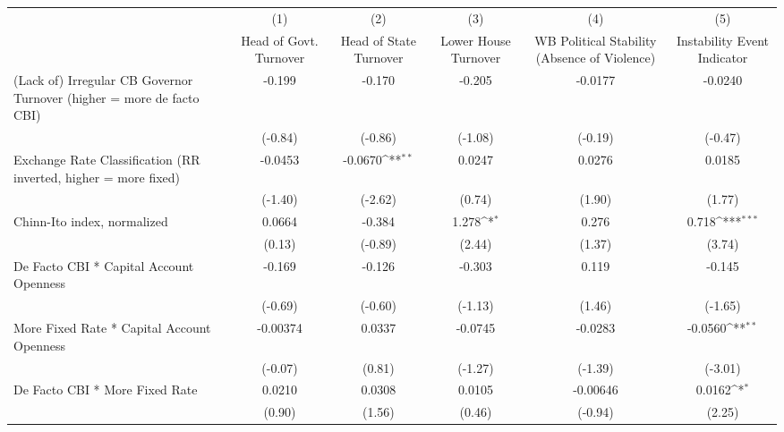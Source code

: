 {
\def\sym#1{\ifmmode^{#1}\else\(^{#1}\)\fi}
\begin{longtable}{l*{5}{c}}
\hline\hline\endfirsthead\hline\endhead\hline\endfoot\endlastfoot
                &\multicolumn{1}{c}{(1)}&\multicolumn{1}{c}{(2)}&\multicolumn{1}{c}{(3)}&\multicolumn{1}{c}{(4)}&\multicolumn{1}{c}{(5)}\\
                &\multicolumn{1}{c}{Head of Govt. Turnover}&\multicolumn{1}{c}{Head of State Turnover}&\multicolumn{1}{c}{Lower House Turnover}&\multicolumn{1}{c}{WB Political Stability (Absence of Violence)}&\multicolumn{1}{c}{Instability Event Indicator}\\
\hline
(Lack of) Irregular CB Governor Turnover (higher = more de facto CBI)&   -0.199         &   -0.170         &   -0.205         &  -0.0177         &  -0.0240         \\
                &  (-0.84)         &  (-0.86)         &  (-1.08)         &  (-0.19)         &  (-0.47)         \\
[1em]
Exchange Rate Classification (RR inverted, higher = more fixed)&  -0.0453         &  -0.0670\sym{**} &   0.0247         &   0.0276         &   0.0185         \\
                &  (-1.40)         &  (-2.62)         &   (0.74)         &   (1.90)         &   (1.77)         \\
[1em]
Chinn-Ito index, normalized&   0.0664         &   -0.384         &    1.278\sym{*}  &    0.276         &    0.718\sym{***}\\
                &   (0.13)         &  (-0.89)         &   (2.44)         &   (1.37)         &   (3.74)         \\
[1em]
De Facto CBI * Capital Account Openness&   -0.169         &   -0.126         &   -0.303         &    0.119         &   -0.145         \\
                &  (-0.69)         &  (-0.60)         &  (-1.13)         &   (1.46)         &  (-1.65)         \\
[1em]
More Fixed Rate * Capital Account Openness& -0.00374         &   0.0337         &  -0.0745         &  -0.0283         &  -0.0560\sym{**} \\
                &  (-0.07)         &   (0.81)         &  (-1.27)         &  (-1.39)         &  (-3.01)         \\
[1em]
De Facto CBI * More Fixed Rate&   0.0210         &   0.0308         &   0.0105         & -0.00646         &   0.0162\sym{*}  \\
                &   (0.90)         &   (1.56)         &   (0.46)         &  (-0.94)         &   (2.25)         \\

\end{longtable}}

